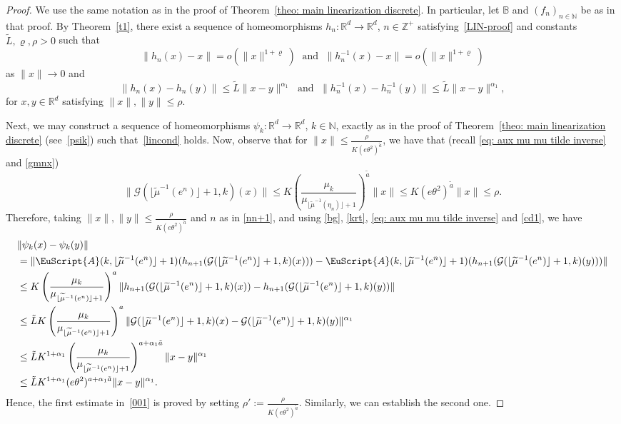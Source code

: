 \documentclass[reqno, a4paper, 10pt]{amsart}
\theoremstyle{plain}
\numberwithin{equation}{section}
\theoremstyle{remark}
\def\N{\mathbb{N}}
\def\cA{\EuScript{A}}
\def\R{\mathbb{R}}
\def\Z{\mathbb{Z}}
\begin{document}
\begin{proof}
We use the same notation as in the proof of Theorem~\ref{theo: main linearization discrete}. In particular, let $\mathbb B$ and $(f_n)_{n\in \N}$ be as in that proof. By Theorem~\ref{t1}, there exist a sequence of homeomorphisms $h_n\colon \R^d \to \R^d$, $n\in \Z^+$ satisfying~\eqref{LIN-proof} and  constants $\tilde L, \varrho,\rho>0$  such that 
\begin{equation}\label{cd0}
\|h_n(x)-x\|=o(\|x\|^{1+\varrho}) \;\text{ and }\;
\|h_n^{-1}(x)-x\|=o(\|x\|^{1+\varrho})
\end{equation}
as $\|x\|\to 0$ and
\begin{equation}\label{cd1}
\|h_n(x)-h_n(y)\|\!\le\! \tilde L\|x-y\|^{\alpha_1} \;\text{ and }\;
\|h_n^{-1}(x)-h_n^{-1}(y)\|\!\le\! \tilde L \|x-y\|^{\alpha_1},
\end{equation}
for $x,y\in\mathbb{R}^d$ satisfying $\|x\|,\|y\|\le \rho$. 

Next, we may construct a sequence of homeomorphisms $\psi_k \colon \R^d \to \R^d$, $k\in \N$, exactly as in the proof of Theorem~\ref{theo: main linearization discrete} (see~\eqref{psik}) such that~\eqref{lincond} holds. Now, observe that for
$\|x\| \le \frac{\rho}{K(e\theta^2)^{\tilde a}}$, we have that (recall \eqref{eq: aux mu mu tilde inverse} and \eqref{gmnx})
\[
\|\mathcal G(\lfloor \widetilde{\mu}^{-1}(e^n)\rfloor+1, k)(x)\| \le K \left (\frac{\mu_k}{\mu_{\lfloor \widetilde{\mu}^{-1}(\eta_n)\rfloor+1}}\right )^{\tilde a}\|x\| \le K(e\theta^2)^{\tilde a}\|x\| \le \rho.
\]
Therefore, taking $\|x\|,\|y\| \le \frac{\rho}{K(e\theta^2)^{\tilde a}}$ and $n$ as in \eqref{nn+1}, and using \eqref{bg},  \eqref{krt}, \eqref{eq: aux mu mu tilde inverse} and \eqref{cd1}, we have
{\small
\[
\begin{split}
&\| \psi_k(x)-\psi_k(y)\|\\
&=\|\cA (k, \lfloor\widetilde\mu^{-1}(e^{n})\rfloor+1)(h_{n+1}(\mathcal G(\lfloor\widetilde\mu^{-1}(e^{n})\rfloor+1, k)(x)))-\cA (k, \lfloor\widetilde\mu^{-1}(e^{n})\rfloor+1)( h_{n+1} ( \mathcal G(\lfloor\widetilde\mu^{-1}(e^{n})\rfloor+1, k)(y)))\| \\
&\le K\left (\frac{\mu_k}{\mu_{\lfloor \widetilde{\mu}^{-1}(e^n)\rfloor+1}}\right )^a\|h_{n+1}(\mathcal G(\lfloor\widetilde\mu^{-1}(e^{n})\rfloor+1, k)(x))- h_{n+1} ( \mathcal G(\lfloor\widetilde\mu^{-1}(e^{n})\rfloor+1, k)(y))\|\\
&\le \tilde{L} K\left (\frac{\mu_k}{\mu_{\lfloor \widetilde{\mu}^{-1}(e^n)\rfloor+1}}\right )^a\|\mathcal G(\lfloor\widetilde\mu^{-1}(e^{n})\rfloor+1, k)(x)-  \mathcal G(\lfloor\widetilde\mu^{-1}(e^{n})\rfloor+1, k)(y)\|^{\alpha_1}\\
&\le \tilde{L} K^{1+\alpha_1}\left (\frac{\mu_k}{\mu_{\lfloor \widetilde{\mu}^{-1}(e^n)\rfloor+1}}\right )^{a+\alpha_1 \tilde a}\| x-y\|^{\alpha_1}\\
&\le \tilde{L} K^{1+\alpha_1}(e\theta^2)^{a+\alpha_1 \tilde a}\| x-y\|^{\alpha_1}.\\
\end{split}
\]}
Hence, the first estimate in~\eqref{001} is proved by setting $\rho':=\frac{\rho}{K(e\theta^2)^{\tilde a}}$. Similarly, we can establish the second one.



\end{proof}
\end{document}
